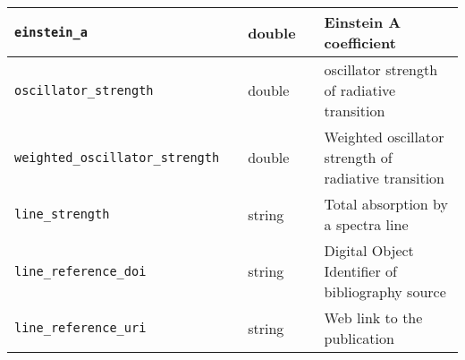 \documentclass[11pt,a4paper]{ivoa}
\begin{document}
\begin{table}[H]
\begin{tabular}{|l|l|l|p{0.8cm}|p{4cm}|}
\hline
\texttt{einstein\_a} & & double  & &  Einstein A coefficient\\
\hline
\texttt{oscillator\_strength} & & double & & oscillator strength of radiative transition \\
\hline
\texttt{weighted\_oscillator\_strength} & & double  & &  Weighted oscillator strength of 
radiative transition \\
\hline
\texttt{line\_strength} & & string & & Total absorption by a spectra line \\
\hline
\texttt{line\_reference\_doi} & & string & & Digital Object Identifier of bibliography source \\
\hline
\texttt{line\_reference\_uri} & & string & & Web link to the publication\\
\hline
\end{tabular}

\end{table}
\end{document}
